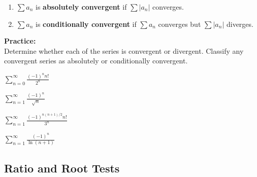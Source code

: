 \documentclass[addpoints, 12pt]{exam}
\begin{document}
\begin{tcolorbox}[title= DEFINITIONS OF ABSOLUTE AND CONDITIONAL CONVERGENCE,black,sharp corners,colback=white,colbacktitle=white,coltitle=black]

    \begin{enumerate}
        \item $\displaystyle\sum a_n$ is \textbf{absolutely convergent} if $\displaystyle\sum\left|a_n\right|$ converges.
        \item $\displaystyle\sum a_n$ is \textbf{conditionally convergent} if $\displaystyle\sum a_n$ converges but $\displaystyle\sum\left|a_n\right|$ diverges.
    \end{enumerate}

\end{tcolorbox}
\vspace{.1in}
\noindent\textbf{Practice:}\\
Determine whether each of the series is convergent or divergent. Classify any convergent series as absolutely or conditionally convergent.
\begin{questions}
    
    \begin{minipage}{0.45\linewidth}
    \question $\displaystyle\sum_{n=0}^\infty \frac{(-1)^n n!}{2^n}$
    \end{minipage}
    \hfill
    \begin{minipage}{0.45\linewidth}
    \question $\displaystyle\sum_{n=1}^\infty \frac{(-1)^n}{\sqrt{n}}$
    \end{minipage}
    
    \begin{minipage}{0.45\linewidth}
    \question $\displaystyle\sum_{n=1}^\infty \frac{(-1)^{n(n+1)/2} n!}{3^n}$
    \end{minipage}
    \hfill
    \begin{minipage}{0.45\linewidth}
    \question $\displaystyle\sum_{n=1}^\infty \frac{(-1)^n}{\ln(n+1)}$
    \end{minipage}
    
    
\end{questions}


\newpage
{}
\subsection*{Ratio and Root Tests}
\end{document}

